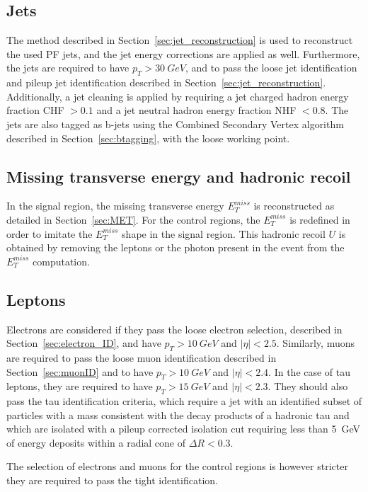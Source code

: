 \subsection{Jets}

The method described in Section~\ref{sec:jet_reconstruction} is used to reconstruct the used \ac{PF} jets, and the jet energy corrections are applied as well. Furthermore, the jets are required to have $p_T > \SI{30}{GeV}$, and to pass the loose jet identification and pileup jet identification described in Section~\ref{sec:jet_reconstruction}. Additionally, a jet cleaning is applied by requiring a jet charged hadron energy fraction CHF $> 0.1$ and a jet neutral hadron energy fraction NHF $< 0.8$. The jets are also tagged as b-jets using the Combined Secondary Vertex algorithm described in Section~\ref{sec:btagging}, with the loose working point.

\subsection{Missing transverse energy and hadronic recoil}

In the signal region, the missing transverse energy $E_T^{miss}$ is reconstructed as detailed in Section~\ref{sec:MET}. For the control regions, the $E_T^{miss}$ is redefined in order to imitate the $E_T^{miss}$ shape in the signal region. This hadronic recoil $U$ is obtained by removing the leptons or the photon present in the event from the $E_T^{miss}$ computation.

\subsection{Leptons}

Electrons are considered if they pass the loose electron selection, described in Section~\ref{sec:electron_ID}, and have $p_T > \SI{10}{GeV}$ and $|\eta| < 2.5$. Similarly, muons are required to pass the loose muon identification described in Section~\ref{sec:muonID} and to have $p_T > \SI{10}{GeV}$ and $|\eta| < 2.4$. In the case of tau leptons, they are required to have $p_T > \SI{15}{GeV}$ and $|\eta| < 2.3$. They should also pass the tau identification criteria, which require a jet with an identified subset of particles with a mass consistent with the decay products of a hadronic tau and which are isolated with a pileup corrected isolation cut requiring less than \SI{5}{GeV} of energy deposits within a radial cone of $\Delta R < 0.3$. 

The selection of electrons and muons for the control regions is however stricter they are required to pass the tight identification.

